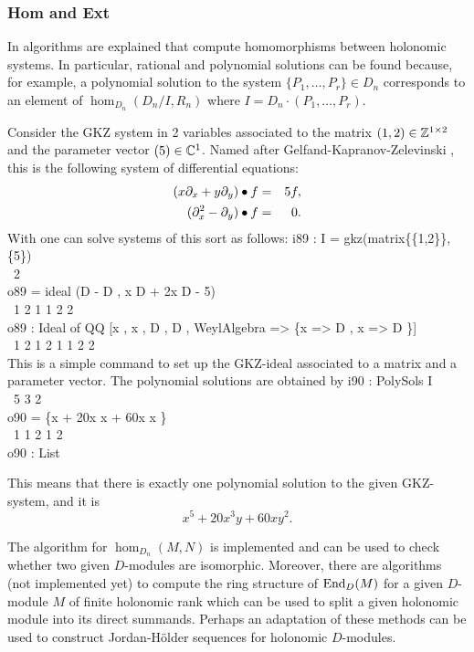 \subsubsection{Hom and Ext}
In \cite{DM:O-T-T,DM:Ts0,DM:T-W} algorithms are explained that compute homomorphisms
between holonomic systems. In particular, rational and polynomial
solutions can be found because, for example, a polynomial solution to the system
$\{P_1,\ldots,P_r\}\in D_n$ corresponds to an element of
$\hom_{D_n}(D_n/I,R_n)$ where $I=D_n\cdot(P_1,\ldots,P_r)$.
\begin{example}
Consider the GKZ system in 2 variables associated to the matrix
$(1,2)\in {\mathbb Z}^{1\times 2}$ and the parameter vector $(5)\in{\mathbb C}^1$. 
Named after
Gelfand-Kapranov-Zelevinski \cite{DM:GKZ}, this 
is the following system of
differential equations:
\begin{eqnarray*}
(x\partial_x+y\partial_y)\bullet f&=&5f,\\
(\partial_x^2-\partial_y)\bullet f&=&0.
\end{eqnarray*}
With \Mtwo one can solve systems of this sort as follows:
\beginOutput
i89 : I = gkz(matrix\{\{1,2\}\}, \{5\})\\
\emptyLine
\              2\\
o89 = ideal (D  - D , x D  + 2x D  - 5)\\
\              1    2   1 1     2 2\\
\emptyLine
o89 : Ideal of QQ [x , x , D , D , WeylAlgebra => \{x  => D , x  => D \}]\\
\                    1   2   1   2                   1     1   2     2\\
\endOutput
This is a simple command to set up the GKZ-ideal associated to a
matrix and a parameter vector. The polynomial solutions are obtained
by
\beginOutput
i90 : PolySols I\\
\emptyLine
\        5      3          2\\
o90 = \{x  + 20x x  + 60x x \}\\
\        1      1 2      1 2\\
\emptyLine
o90 : List\\
\endOutput

This means that there is exactly one polynomial solution to the given
GKZ-system, and it is 
\[
x^5+20x^3y+60xy^2.
\]
\end{example}
The algorithm for $\hom_{D_n}(M,N)$ is implemented and
can be used to check whether two given $D$-modules are
isomorphic. 
Moreover, there are algorithms (not implemented yet) 
to compute the ring structure of
$\operatorname{End}_D(M)$ for a given $D$-module $M$ of finite holonomic
rank which can be used to split a given holonomic module into its
direct summands. 
Perhaps an adaptation of these methods can be used to construct
Jordan-H\"older sequences for holonomic $D$-modules.

